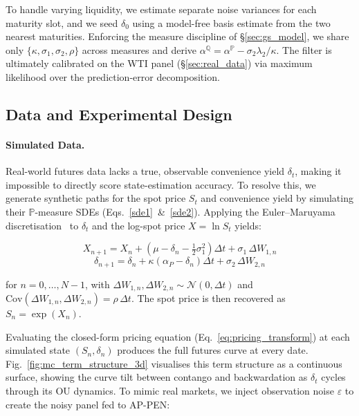 \documentclass[sigconf, authorversion=true, nonacm=true]{acmart}
\begin{document}
To handle varying liquidity, we estimate separate noise variances for each maturity slot, and we seed $\delta_0$ using a model-free basis estimate from the two nearest maturities. Enforcing the measure discipline of \S\ref{sec:gs_model}, we share only $\{\kappa,\sigma_1,\sigma_2,\rho\}$ across measures and derive $\alpha^{\mathbb{Q}} = \alpha^{\mathbb{P}}-\sigma_2\lambda_2/\kappa$. The filter is ultimately calibrated on the WTI panel (\S\ref{sec:real_data}) via maximum likelihood over the prediction-error decomposition.


\subsection{Data and Experimental Design}
\label{sec:experimental_design}

\paragraph{Simulated Data.} Real-world futures data lacks a true, observable convenience yield $\delta_t$, making it impossible to directly score state-estimation accuracy. To resolve this, we generate synthetic paths for the spot price $S_t$ and convenience yield by simulating their $\mathbb{P}$-measure SDEs (Eqs.~\ref{sde1}~\&~\ref{sde2}). Applying the Euler--Maruyama discretisation~\cite{maruyama1955continuous, higham2001algorithmic} to $\delta_t$ and the log-spot price $X = \ln S_t$ yields:

\begin{equation}
X_{n+1} = X_n + \left(\mu - \delta_n - \tfrac{1}{2}\sigma_1^2\right)\Delta t + \sigma_1\,\Delta W_{1,n}
\label{eq:x_discrete_em}
\end{equation}
\begin{equation}
    \delta_{n+1} = \delta_n + \kappa\left(\alpha_P - \delta_n\right)\Delta t + \sigma_2\,\Delta W_{2,n}
    \label{eq:delta_discrete_em}
\end{equation}

for $n = 0,\dots,N-1$, with $\Delta W_{1,n},\Delta W_{2,n}\sim\mathcal{N}(0,\Delta t)$ and $\mathrm{Cov}(\Delta W_{1,n},\Delta W_{2,n})=\rho\,\Delta t$. The spot price is then recovered as $S_n = \exp(X_n)$.

Evaluating the closed-form pricing equation (Eq.~\ref{eq:pricing_transform}) at each simulated state $(S_n, \delta_n)$ produces the full futures curve at every date. Fig.~\ref{fig:mc_term_structure_3d} visualises this term structure as a continuous surface, showing the curve tilt between contango and backwardation as $\delta_t$ cycles through its OU dynamics. To mimic real markets, we inject observation noise $\varepsilon$ to create the noisy panel fed to AP-PEN:
\end{document}
